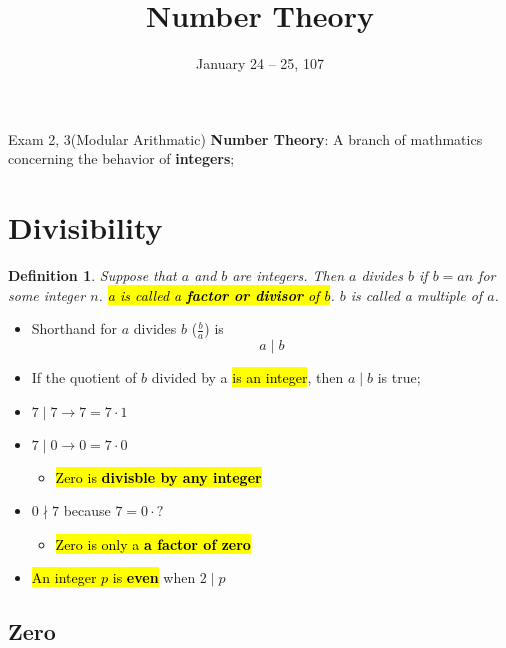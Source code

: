 \documentclass{note}
\date{January 24 -- 25, 107}
\title{Number Theory}
\newtheorem{definition}{Definition}
\begin{document}
    \begin{note}{Exam 2, 3(Modular Arithmatic)}
        \textbf{Number Theory}: A branch of mathmatics concerning the behavior of \textbf{integers};

        \section{Divisibility}

        \begin{definition}
            Suppose that $ a $ and $ b $ are integers. Then $ a $ divides $ b $ if $ b = an $
            for some integer $ n $. \hl{a is called a \textbf{factor or divisor} of $ b $}. $ b $ is called a multiple of $ a $.
        \end{definition}

        \begin{itemize}
            \item Shorthand for $ a $ divides $ b $ ($ \frac{b}{a} $) is
            \begin{equation}\label{eq: shorthand for divide}
                a \mid b
            \end{equation}
            \item If the quotient of $ b $ divided by a \hl{is an integer}, then $ a \mid b $ is true;
            \item $ 7 \mid 7 \to 7 = 7 \cdot 1 $
            \item $ 7 \mid 0 \to 0 = 7 \cdot 0 $ 
            \begin{itemize}
                \item \hl{Zero is \textbf{divisble by any integer}}
            \end{itemize}
            \item $ 0 \nmid 7 $ because $ 7 = 0 \cdot ? $
            \begin{itemize}
                \item \hl{Zero is only a \textbf{a factor of zero}}
            \end{itemize}

            \item \hl{An integer $ p $ is \textbf{even}} when $ 2 \mid p $
        \end{itemize}

        \subsection{Zero}


\end{note}
\end{document}
